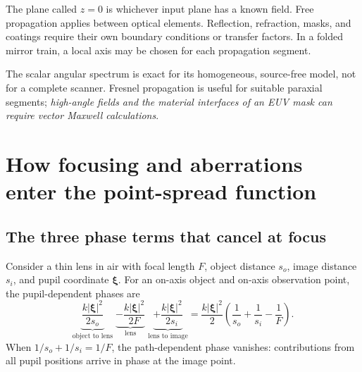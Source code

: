\documentclass[11pt,a4paper]{article}
\numberwithin{equation}{section}
\newcommand{\ii}{\mathrm{i}}
\newcommand{\ee}{\mathrm{e}}
\newcommand{\vct}[1]{\bm{#1}}
\begin{document}
The plane called $z=0$ is whichever input plane has a known field. 
Free propagation applies between optical elements.
Reflection, refraction, masks, and coatings require their own boundary
conditions or transfer factors. In a folded mirror train, a local axis
may be chosen for each propagation segment.


The scalar angular spectrum is exact for its homogeneous,
source-free model, not for a complete scanner. Fresnel propagation is
useful for suitable paraxial segments; \emph{high-angle fields and the material
interfaces of an EUV mask can require vector Maxwell calculations}.

\section{How focusing and aberrations enter the point-spread function}
\subsection{The three phase terms that cancel at focus}
Consider a thin lens in air with focal length $F$, object distance $s_o$,
image distance $s_i$, and pupil coordinate $\vct\xi$.
For an on-axis object and on-axis observation point, the pupil-dependent
phases are
\begin{equation}
\underbrace{\frac{k|\vct\xi|^2}{2s_o}}_{\text{object to lens}}
\;\underbrace{-\frac{k|\vct\xi|^2}{2F}}_{\text{lens}}
\;\underbrace{+\frac{k|\vct\xi|^2}{2s_i}}_{\text{lens to image}}
=\frac{k|\vct\xi|^2}{2}
\left(\frac1{s_o}+\frac1{s_i}-\frac1F\right).
\label{eq:three-phases}
\end{equation}
When $1/s_o+1/s_i=1/F$, the path-dependent phase vanishes:
contributions from all pupil positions arrive in phase at the image point.
\end{document}
